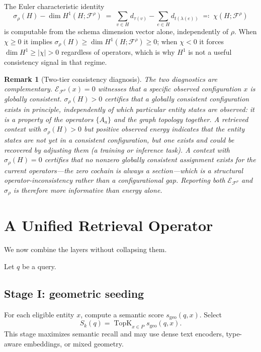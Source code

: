 \documentclass[11pt]{article}
\newtheorem{remark}[definition]{Remark}
\newcommand{\Energy}{\mathcal{E}}
\newcommand{\F}{\mathcal{F}}
\begin{document}
The Euler characteristic identity
\[
\sigma_\rho(H) - \dim H^1(H;\F^{\rho}) \;=\; \sum_{v\in H}d_{\tau(v)} - \sum_{e\in H}d_{t(\lambda(e))}\;\eqqcolon\;\chi(H;\F^{\rho})
\]
is computable from the schema dimension vector alone, independently of $\rho$. When $\chi\ge0$ it implies $\sigma_\rho(H)\ge\dim H^1(H;\F^{\rho})\ge0$; when $\chi<0$ it forces $\dim H^1\ge|\chi|>0$ regardless of operators, which is why $H^1$ is not a useful consistency signal in that regime.

\begin{remark}[Two-tier consistency diagnosis]
\label{rem:h1-vs-energy}
The two diagnostics are complementary. $\Energy_{\F^{\rho}}(x)=0$ witnesses that a \emph{specific} observed configuration $x$ is globally consistent. $\sigma_\rho(H)>0$ certifies that a globally consistent configuration \emph{exists in principle}, independently of which particular entity states are observed: it is a property of the operators $\{A_a\}$ and the graph topology together. A retrieved context with $\sigma_\rho(H)>0$ but positive observed energy indicates that the entity states are not yet in a consistent configuration, but one exists and could be recovered by adjusting them (a training or inference task). A context with $\sigma_\rho(H)=0$ certifies that no \emph{nonzero} globally consistent assignment exists for the current operators---the zero cochain is always a section---which is a structural operator-inconsistency rather than a configurational gap. Reporting both $\Energy_{\F^{\rho}}$ and $\sigma_\rho$ is therefore more informative than energy alone.
\end{remark}

\section{A Unified Retrieval Operator}

We now combine the layers without collapsing them.

Let $q$ be a query.

\subsection{Stage I: geometric seeding}
For each eligible entity $x$, compute a semantic score $s_{\mathrm{geo}}(q,x)$. Select
\[
S_k(q)=\operatorname{TopK}_{x\in P}s_{\mathrm{geo}}(q,x).
\]
This stage maximizes semantic recall and may use dense text encoders, type-aware embeddings, or mixed geometry.
\end{document}
